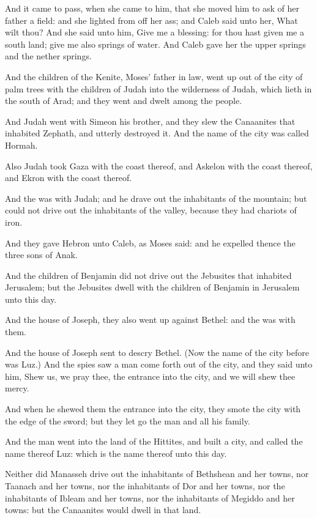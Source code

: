 \verse And it came to pass, when she came to him, that she moved him to ask of her father a field: and she lighted from off her ass; and Caleb said unto her, What wilt thou?  \verse And she said unto him, Give me a blessing: for thou hast given me a south land; give me also springs of water. And Caleb gave her the upper springs and the nether springs.

\verse And the children of the Kenite, Moses' father in law, went up out of the city of palm trees with the children of Judah into the wilderness of Judah, which lieth in the south of Arad; and they went and dwelt among the people.

\verse And Judah went with Simeon his brother, and they slew the Canaanites that inhabited Zephath, and utterly destroyed it. And the name of the city was called Hormah.

\verse Also Judah took Gaza with the coast thereof, and Askelon with the coast thereof, and Ekron with the coast thereof.

\verse And the \LORD was with Judah; and he drave out the inhabitants of the mountain; but could not drive out the inhabitants of the valley, because they had chariots of iron.

\verse And they gave Hebron unto Caleb, as Moses said: and he expelled thence the three sons of Anak.

\verse And the children of Benjamin did not drive out the Jebusites that inhabited Jerusalem; but the Jebusites dwell with the children of Benjamin in Jerusalem unto this day.

\verse And the house of Joseph, they also went up against Bethel: and the \LORD was with them.

\verse And the house of Joseph sent to descry Bethel. (Now the name of the city before was Luz.)  \verse And the spies saw a man come forth out of the city, and they said unto him, Shew us, we pray thee, the entrance into the city, and we will shew thee mercy.

\verse And when he shewed them the entrance into the city, they smote the city with the edge of the sword; but they let go the man and all his family.

\verse And the man went into the land of the Hittites, and built a city, and called the name thereof Luz: which is the name thereof unto this day.

\verse Neither did Manasseh drive out the inhabitants of Bethshean and her towns, nor Taanach and her towns, nor the inhabitants of Dor and her towns, nor the inhabitants of Ibleam and her towns, nor the inhabitants of Megiddo and her towns: but the Canaanites would dwell in that land.

